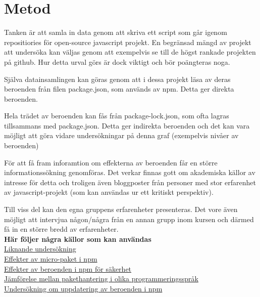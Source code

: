 \section{Metod}
\label{sec:joel_a-method}
Tanken är att samla in data genom att skriva ett script som går igenom repositiories för open-source javascript projekt. En begränsad mängd av projekt att undersöka kan väljas genom att exempelvis se till de högst rankade projekten på github. Hur detta urval görs är dock viktigt och bör poängteras noga.

Själva datainsamlingen kan göras genom att i dessa  projekt läsa av deras beroenden från filen package.json, som används av npm. Detta ger direkta beroenden.

Hela trädet av beroenden kan fås från package-lock.json, som ofta lagras tillsammans med package.json. Detta ger indirekta beroenden och det kan vara möjligt att göra vidare undersökningar på denna graf (exempelvis nivåer av beroenden)

För att få fram inforamtion om effekterna av beroenden får en större informationssökning genomföras. Det verkar finnas gott om akademiska källor av intresse för detta och troligen även bloggposter från personer med stor erfarenhet av javascript-projekt (som kan användas ur ett kritiskt perspektiv).

Till viss del kan den egna gruppens erfarenheter presenteras. Det vore även möjligt att intervjua någon/några från en annan grupp inom kursen och därmed få in en större bredd av erfarenheter.\\

\textbf{Här följer några källor som kan användas}\\
\href{https://dspace.cvut.cz/bitstream/handle/10467/68195/F8-DP-2017-Zitny-Jakub-thesis.pdf?sequence=1&isAllowed=y}{Liknande undersökning}\\
\href{https://arxiv.org/pdf/1709.04638.pdf}{Effekter av micro-paket i npm}\\
\href{https://repository.tudelft.nl/islandora/object/uuid:3a15293b-16f6-4e9d-b6a2-f02cd52f1a9e?collection=education}{Effekter av beroenden i npm för säkerhet}\\ \href{https://arxiv.org/pdf/1710.04936.pdf}{Jämförelse mellan pakethantering i olika programmeringsspråk}\\ \href{http://www.scotthenry.ca/wp-content/uploads/2018/01/Report.pdf}{Undersökning om uppdatering av beroenden i npm}\\
